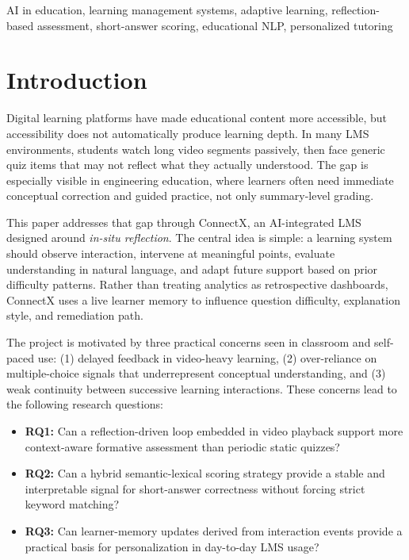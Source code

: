\documentclass[conference]{IEEEtran}
\begin{document}
\begin{IEEEkeywords}
AI in education, learning management systems, adaptive learning, reflection-based assessment, short-answer scoring, educational NLP, personalized tutoring
\end{IEEEkeywords}

\section{Introduction}
Digital learning platforms have made educational content more accessible, but accessibility does not automatically produce learning depth. In many LMS environments, students watch long video segments passively, then face generic quiz items that may not reflect what they actually understood. The gap is especially visible in engineering education, where learners often need immediate conceptual correction and guided practice, not only summary-level grading.

This paper addresses that gap through ConnectX, an AI-integrated LMS designed around \textit{in-situ reflection}. The central idea is simple: a learning system should observe interaction, intervene at meaningful points, evaluate understanding in natural language, and adapt future support based on prior difficulty patterns. Rather than treating analytics as retrospective dashboards, ConnectX uses a live learner memory to influence question difficulty, explanation style, and remediation path.

The project is motivated by three practical concerns seen in classroom and self-paced use: (1) delayed feedback in video-heavy learning, (2) over-reliance on multiple-choice signals that underrepresent conceptual understanding, and (3) weak continuity between successive learning interactions. These concerns lead to the following research questions:

\begin{itemize}
\item \textbf{RQ1:} Can a reflection-driven loop embedded in video playback support more context-aware formative assessment than periodic static quizzes?
\item \textbf{RQ2:} Can a hybrid semantic-lexical scoring strategy provide a stable and interpretable signal for short-answer correctness without forcing strict keyword matching?
\item \textbf{RQ3:} Can learner-memory updates derived from interaction events provide a practical basis for personalization in day-to-day LMS usage?
\end{itemize}
\end{document}
